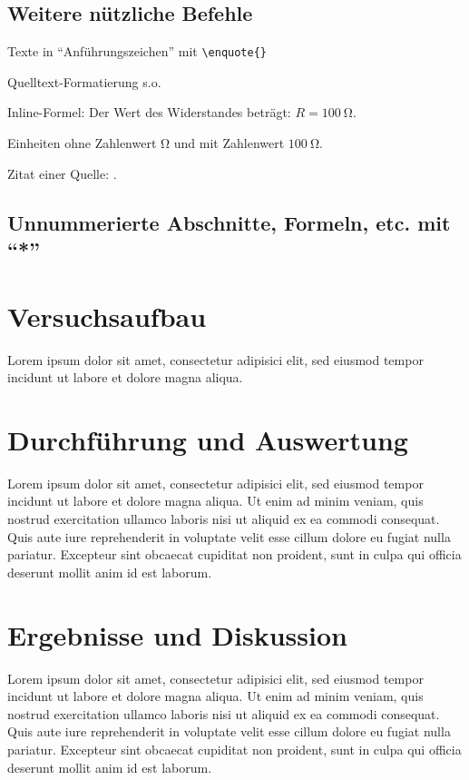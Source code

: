 \subsection{Weitere nützliche Befehle}
	Texte in \enquote{Anführungszeichen} mit \verb|\enquote{}|
	
	Quelltext-Formatierung s.o.
	
	Inline-Formel: Der Wert des Widerstandes beträgt: $R = \SI{100}{\ohm}$.
	
	Einheiten ohne Zahlenwert $\si{\ohm}$ und mit Zahlenwert $\SI{100}{\ohm}$.
	
	Zitat einer Quelle: \cite{Versuchsanleitung}.
	
\subsection*{Unnummerierte Abschnitte, Formeln, etc. mit \enquote{*}}
	
	

\section{Versuchsaufbau}
	 Lorem ipsum dolor sit amet, consectetur adipisici elit, sed eiusmod tempor incidunt ut labore et dolore magna aliqua.


\section{Durchführung und Auswertung}
	Lorem ipsum dolor sit amet, consectetur adipisici elit, sed eiusmod tempor incidunt ut labore et dolore magna aliqua. Ut enim ad minim veniam, quis nostrud exercitation ullamco laboris nisi ut aliquid ex ea commodi consequat. Quis aute iure reprehenderit in voluptate velit esse cillum dolore eu fugiat nulla pariatur. Excepteur sint obcaecat cupiditat non proident, sunt in culpa qui officia deserunt mollit anim id est laborum. 




\section{Ergebnisse und Diskussion}
	Lorem ipsum dolor sit amet, consectetur adipisici elit, sed eiusmod tempor incidunt ut labore et dolore magna aliqua. Ut enim ad minim veniam, quis nostrud exercitation ullamco laboris nisi ut aliquid ex ea commodi consequat. Quis aute iure reprehenderit in voluptate velit esse cillum dolore eu fugiat nulla pariatur. Excepteur sint obcaecat cupiditat non proident, sunt in culpa qui officia deserunt mollit anim id est laborum. 
	
